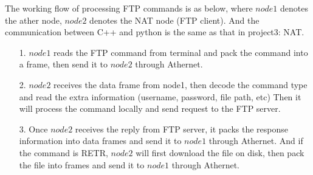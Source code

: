 \documentclass[11pt, conference]{IEEEtran}
\begin{document}
    The working flow of processing FTP commands is as below, where $node1$ denotes the ather node,
    $node2$ denotes the NAT node (FTP client). And the communication between C++ and python is the same as that
    in project3: NAT.
    \begin{enumerate}
        \item [1.] $node1$ reads the FTP command from terminal and pack the command into a frame, then send it
        to $node2$ through Athernet.
        \item [2.] $node2$ receives the data frame from node1, then decode the command type and read the extra information (username, password, file path, etc)
        Then it will process the command locally and send request to the FTP server.
        \item [3.] Once $node2$ receives the reply from FTP server, it packs the response information into data frames and send it to $node1$ through Athernet.
        And if the command is RETR, $node2$ will first download the file on disk, then pack the file into frames and send it to $node1$ through Athernet.  
    \end{enumerate}
\clearpage

\end{document}
